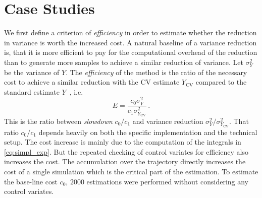 
\section{Case Studies}\label{sec:cv:study}
We first define a criterion of \emph{efficiency} in order to estimate
whether the reduction in variance is worth the increased cost.
A natural baseline of a variance reduction is, that it is more efficient to pay for
the computational overhead of the reduction than to generate more samples to achieve a similar
reduction of variance.
Let $\sigma_Y^2$ be the variance of $Y$.
The \emph{efficiency} of the method is the ratio of the necessary
cost to achieve a similar reduction with the \ac{CV} estimate $Y_{\text{CV}}$ compared to
the standard estimate $Y$~\cite{l1994efficiency}, i.e.
\begin{equation}\label{eq:efficiency}
E=\frac{c_0\sigma_Y^2}{c_1\sigma^2_{Y_{\text{CV}}}}\,.
\end{equation}
This is the ratio between \emph{slowdown} $c_0/c_1$ and variance reduction $\sigma_{Y}^2 / \sigma_{Y_{\text{CV}}}^2$.
That ratio $c_0/c_1$ depends heavily on both the specific implementation and the technical setup.
The cost increase is  mainly due to the computation of the integrals in \eqref{eq:simpl_exp}.
But the repeated checking of control  variates for efficiency also increases the cost.
The accumulation over the trajectory directly increases the cost of a single simulation
which is the critical part of the estimation.
To estimate the base-line cost $c_0$, $2000$ estimations were performed without
considering any control variates.

